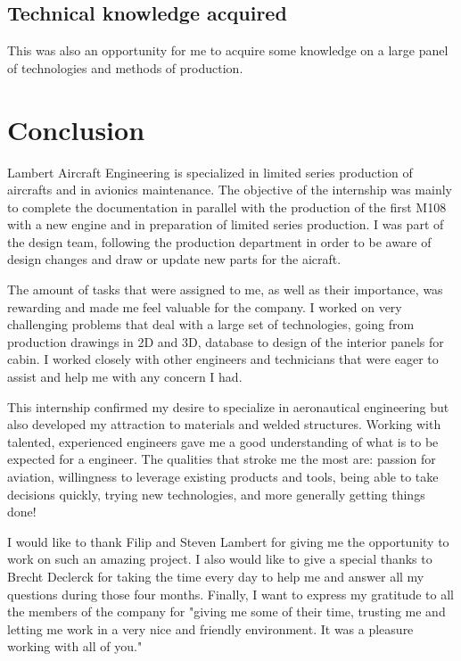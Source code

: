 \documentclass[11pt,a4paper]{report}
\begin{document}
\subsection{Technical knowledge acquired}
This was also an opportunity for me to acquire some knowledge on a large panel of technologies and methods of production.

\newpage

\section{Conclusion}
Lambert Aircraft Engineering is specialized in limited series production of aircrafts and in avionics maintenance. The objective of the internship was mainly to complete the documentation in parallel with the production of the first M108 with a new engine and in preparation of limited series production. I was part of the design team, following the production department in order to be aware of design changes and draw or update new parts for the aicraft.

\bigskip

The amount of tasks that were assigned to me, as well as their importance, was rewarding and made me feel valuable for the company. I worked on very challenging problems that deal with a large set of technologies, going from production drawings in 2D and 3D, database to design of the interior panels for cabin. I worked closely with other engineers and technicians that were eager to assist and help me with any concern I had.

\bigskip

This internship confirmed my desire to specialize in aeronautical engineering but also developed my attraction to materials and welded structures. Working with talented, experienced engineers gave me a good understanding of what is to be expected for a engineer. The qualities that stroke me the most are: passion for aviation, willingness to leverage existing products and tools, being able to take decisions quickly, trying new technologies, and more generally getting things done!

\bigskip

I would like to thank Filip and Steven Lambert for giving me the opportunity to work on such an amazing project. I also would like to give a special thanks to Brecht Declerck for taking the time every day to help me and answer all my questions during those four months. Finally, I want to express my gratitude to all the members of the company for "giving me some of their time, trusting me and letting me work in a very nice and friendly environment. It was a pleasure working with all of you." %
\end{document}
